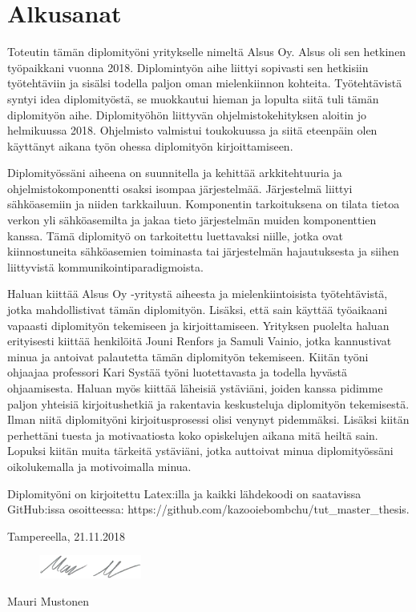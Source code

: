 \chapter*{Alkusanat}
\label{ch:alkusanat}
Toteutin tämän diplomityöni yritykselle nimeltä Alsus Oy. Alsus oli sen hetkinen työpaikkani vuonna 2018. Diplomintyön aihe liittyi sopivasti sen hetkisiin työtehtäviin ja sisälsi todella paljon oman mielenkiinnon kohteita. Työtehtävistä syntyi idea diplomityöstä, se muokkautui hieman ja lopulta siitä tuli tämän diplomityön aihe. Diplomityöhön liittyvän ohjelmistokehityksen aloitin jo helmikuussa 2018. Ohjelmisto valmistui toukokuussa ja siitä eteenpäin olen käyttänyt aikana työn ohessa diplomityön kirjoittamiseen.

Diplomityössäni aiheena on suunnitella ja kehittää arkkitehtuuria ja ohjelmistokomponentti osaksi isompaa järjestelmää. Järjestelmä liittyi sähköasemiin ja niiden tarkkailuun. Komponentin tarkoituksena on tilata tietoa verkon yli sähköasemilta ja jakaa tieto järjestelmän muiden komponenttien kanssa. Tämä diplomityö on tarkoitettu luettavaksi niille, jotka ovat kiinnostuneita sähköasemien toiminasta tai järjestelmän hajautuksesta ja siihen liittyvistä kommunikointiparadigmoista.

Haluan kiittää Alsus Oy -yritystä aiheesta ja mielenkiintoisista työtehtävistä, jotka mahdollistivat tämän diplomityön. Lisäksi, että sain käyttää työaikaani vapaasti diplomityön tekemiseen ja kirjoittamiseen. Yrityksen puolelta haluan erityisesti kiittää henkilöitä Jouni Renfors ja Samuli Vainio, jotka kannustivat minua ja antoivat palautetta tämän diplomityön tekemiseen. Kiitän työni ohjaajaa professori Kari Systää työni luotettavasta ja todella hyvästä ohjaamisesta. Haluan myös kiittää läheisiä ystäviäni, joiden kanssa pidimme paljon yhteisiä kirjoitushetkiä ja rakentavia keskusteluja diplomityön tekemisestä. Ilman niitä diplomityöni kirjoitusprosessi olisi venynyt pidemmäksi. Lisäksi kiitän perhettäni tuesta ja motivaatiosta koko opiskelujen aikana mitä heiltä sain. Lopuksi kiitän muita tärkeitä ystäviäni, jotka auttoivat minua diplomityössäni oikolukemalla ja motivoimalla minua.

Diplomityöni on kirjoitettu Latex:illa ja kaikki lähdekoodi on saatavissa GitHub:issa osoitteessa: https://github.com/kazooiebombchu/tut\_master\_thesis.

\vspace{2\baselineskip}

Tampereella, 21.11.2018

\begin{figure}[ht!]
	\includegraphics[width=0.3\textwidth,left]{pictures/signature.png}
\end{figure}

Mauri Mustonen